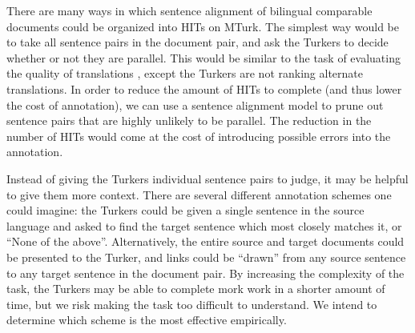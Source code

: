 \documentclass[11pt,letterpaper]{article}
\newcommand{\remove}[1]{}
\begin{document}
There are many ways in which sentence alignment of bilingual comparable
documents could be organized into HITs on MTurk. The simplest way would be to
take all sentence pairs in the document pair, and ask the Turkers to decide
whether or not they are parallel. This would be similar to the task of
evaluating the quality of translations \cite{Callison-Burch09}, except the
Turkers are not ranking alternate translations.
In order to reduce the amount of HITs to complete (and thus lower the cost of
annotation), we can use a sentence alignment model to prune out sentence pairs
that are highly unlikely to be parallel. The reduction in the number of HITs
would come at the cost of introducing possible errors into the annotation.

\remove{
\begin{figure}[ht]
\texttt{[image: images/turk.jpg]}
\caption{Different schemes for allowing Turkers to annotate sentence alignment.
(A) is the simplest case, where the Turkers are asked to judge whether or not
individual sentence pairs are parallel. In (B), the Turker is given a single
sentence in the source language and asked to find the target sentence which most
closely matches it, or ``None of the above''. The scheme in (C) allows alignment
links to be ``drawn'' from any source sentence to any target sentence in the
document pair. (D) allows the Turker to annotate a monotonic alignment of the
document pair by choosing the ``Skip Left'', ``Skip Right'', or ``Match''
buttons. In addition, the ``Merge'' buttons allow $n:m$ alignments by combining
adjacent sentences.}
\label{fig:turk}
\end{figure}
A few different possible task layouts are
given in Figure \ref{fig:turk}.
}

Instead of giving the Turkers individual sentence pairs to judge, it may be
helpful to give them more context.
There are several different annotation schemes one could imagine:
the Turkers could be given a single
sentence in the source language and asked to find the target sentence which most
closely matches it, or ``None of the above''. Alternatively, the entire source
and target documents could be presented to the Turker, and 
links could be ``drawn'' from any source sentence to any target sentence in the
document pair.
By increasing the complexity of the task, the
Turkers may be able to complete mork work in a shorter amount of time, but we
risk making the task too difficult to understand. We intend to determine which
scheme is the most effective empirically.
\end{document}
